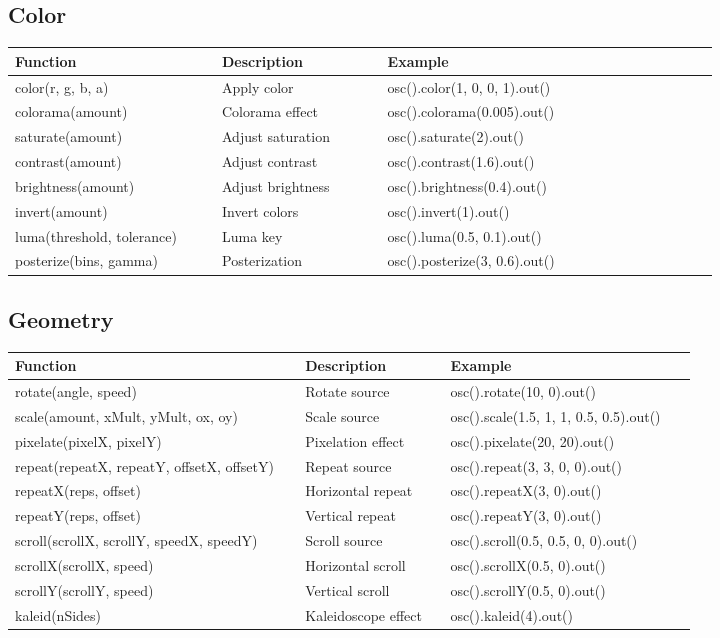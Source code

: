 \documentclass[9pt,oneside]{amsart}
\begin{document}
\subsection*{Color}
\begin{tabular}{L{0.25\linewidth}L{0.20\linewidth}L{0.40\linewidth}}
\toprule
\textbf{Function} & \textbf{Description} & \textbf{Example} \\
\midrule
color(r, g, b, a) & Apply color & osc().color(1, 0, 0, 1).out() \\
colorama(amount) & Colorama effect & osc().colorama(0.005).out() \\
saturate(amount) & Adjust saturation & osc().saturate(2).out() \\
contrast(amount) & Adjust contrast & osc().contrast(1.6).out() \\
brightness(amount) & Adjust brightness & osc().brightness(0.4).out() \\
invert(amount) & Invert colors & osc().invert(1).out() \\
luma(threshold, tolerance) & Luma key & osc().luma(0.5, 0.1).out() \\
posterize(bins, gamma) & Posterization & osc().posterize(3, 0.6).out() \\
\bottomrule
\end{tabular}

\subsection*{Geometry}
\begin{tabular}{L{0.40\linewidth}L{0.20\linewidth}L{0.34\linewidth}}
\toprule
\textbf{Function} & \textbf{Description} & \textbf{Example} \\
\midrule
rotate(angle, speed) & Rotate source & osc().rotate(10, 0).out() \\
scale(amount, xMult, yMult, ox, oy) & Scale source & osc().scale(1.5, 1, 1, 0.5, 0.5).out() \\
pixelate(pixelX, pixelY) & Pixelation effect & osc().pixelate(20, 20).out() \\
repeat(repeatX, repeatY, offsetX, offsetY) & Repeat source & osc().repeat(3, 3, 0, 0).out() \\
repeatX(reps, offset) & Horizontal repeat & osc().repeatX(3, 0).out() \\
repeatY(reps, offset) & Vertical repeat & osc().repeatY(3, 0).out() \\
scroll(scrollX, scrollY, speedX, speedY) & Scroll source & osc().scroll(0.5, 0.5, 0, 0).out() \\
scrollX(scrollX, speed) & Horizontal scroll & osc().scrollX(0.5, 0).out() \\
scrollY(scrollY, speed) & Vertical scroll & osc().scrollY(0.5, 0).out() \\
kaleid(nSides) & Kaleidoscope effect & osc().kaleid(4).out() \\
\bottomrule
\end{tabular}
\end{document}

